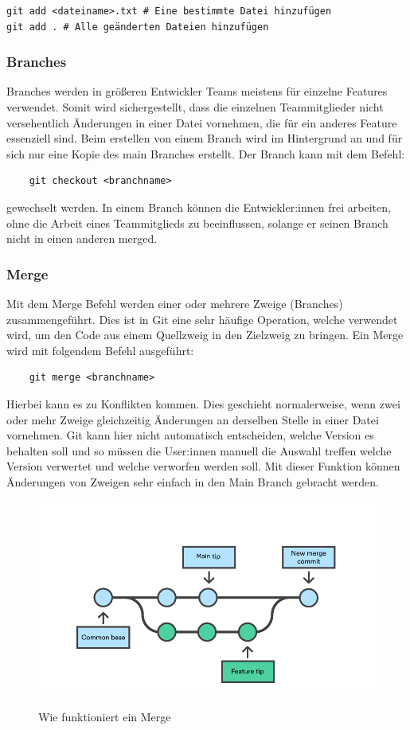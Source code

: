 \begin{verbatim}
git add <dateiname>.txt # Eine bestimmte Datei hinzufügen
git add . # Alle geänderten Dateien hinzufügen
\end{verbatim}

\subsubsection{Branches}

Branches werden in größeren Entwickler Teams meistens für einzelne Features verwendet. Somit wird sichergestellt, dass die einzelnen Teammitglieder nicht versehentlich Änderungen in einer Datei vornehmen, die für ein anderes Feature essenziell sind. Beim erstellen von einem Branch wird im Hintergrund an und für sich nur eine Kopie des main Branches erstellt. Der Branch kann mit dem Befehl: 

\begin{verbatim}
    git checkout <branchname>
\end{verbatim}

gewechselt werden.
In einem Branch können die Entwickler:innen frei arbeiten, ohne die Arbeit eines Teammitglieds zu beeinflussen, solange er seinen Branch nicht in einen anderen merged.
\cite{Github_Branches}

\subsubsection{Merge}

Mit dem Merge Befehl werden einer oder mehrere Zweige (Branches) zusammengeführt. Dies ist in Git eine sehr häufige Operation, welche verwendet wird, um den Code aus einem Quellzweig in den Zielzweig zu bringen.
Ein Merge wird mit folgendem Befehl ausgeführt: 

\begin{verbatim}
    git merge <branchname>
\end{verbatim}

Hierbei kann es zu Konflikten kommen. Dies geschieht normalerweise, wenn zwei oder mehr Zweige gleichzeitig Änderungen an derselben Stelle in einer Datei vornehmen. Git kann hier nicht automatisch entscheiden, welche Version es behalten soll und so müssen die User:innen manuell die Auswahl treffen welche Version verwertet und welche verworfen werden soll. Mit dieser Funktion können Änderungen von Zweigen sehr einfach in den Main Branch gebracht werden.

\begin{figure}[h!]
    \centering
    \includegraphics[width=0.6\linewidth]{pics/merge.png}
    \caption{Wie funktioniert ein Merge}
    \label{fig:enter-label}
    \cite{merge_grafik}
\end{figure}


